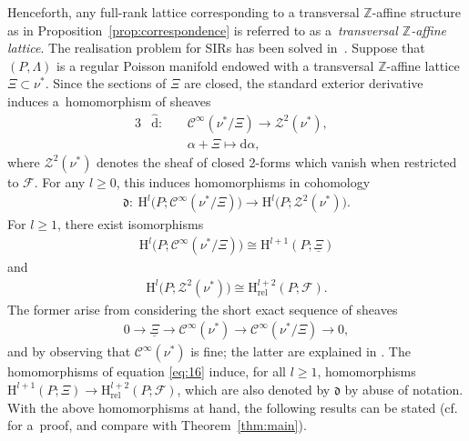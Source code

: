 \documentclass[10pt,a4paper]{amsart}
\numberwithin{equation}{section}
\newcommand{\de}{\mathrm{d}} %
\newcommand{\PM}{(P,\Lambda)} %
\newcommand{\HH}{\mathrm{H}}
\newcommand{\ZZ}{\mathbb{Z}}
\begin{document}
Henceforth, any full-rank lattice corresponding to a transversal $\ZZ$-af\/f\/ine structure as in Proposition~\ref{prop:correspondence} is referred to as a~{\it transversal $\ZZ$-affine lattice}. The realisation problem for SIRs has been solved in~\cite{dd}. Suppose that $\PM$ is a regular Poisson manifold endowed with a transversal $\ZZ$-af\/f\/ine lattice $\Xi \subset \nu^*$. Since the sections of $\Xi$ are closed, the standard exterior derivative induces a~homomorphism of sheaves
\begin{alignat*}{3}
 & \hat{\de} \colon \ && \mathcal{C}^{\infty}\left(\nu^* /\Xi \right) \to \mathcal{Z}^2(\nu^*), & \\
 &&& \alpha + \Xi \mapsto \de \alpha,&
\end{alignat*}
where $\mathcal{Z}^2(\nu^*)$ denotes the sheaf of closed 2-forms which vanish when restricted to $\mathcal{F}$. For any $l \geq 0$, this induces homomorphisms in cohomology
\begin{gather} \label{eq:16}
 \mathfrak{d}\colon \ \HH^l\big(P;\mathcal{C}^{\infty} (\nu^* /\Xi )\big) \to \HH^l\big(P;\mathcal{Z}^2(\nu^*)\big).
\end{gather}
For $l \geq 1$, there exist isomorphisms
\begin{gather*}
 \HH^l\big(P;\mathcal{C}^{\infty} (\nu^* /\Xi )\big) \cong \HH^{l+1} (P;\underline{\Xi} )
\end{gather*}
and
\begin{gather*}
 \HH^l\big(P;\mathcal{Z}^2(\nu^*)\big) \cong \HH_{\mathrm{rel}}^{l+2}(P;\mathcal{F}).
\end{gather*}
The former arise from considering the short exact sequence of sheaves
\begin{gather*} %
 0 \to \underline{\Xi} \to \mathcal{C}^{\infty}(\nu^*) \to \mathcal{C}^{\infty}(\nu^*/\Xi) \to 0,
\end{gather*}
and by observing that $\mathcal{C}^{\infty}(\nu^*)$ is f\/ine; the latter are explained in \cite[Section~4, Part~(a)]{dd}. The homomorphisms of equation \eqref{eq:16} induce, for all $l \geq 1$, homomorphisms $\HH^{l+1}(P;\Xi) \to \HH^{l+2}_{\mathrm{rel}}(P;\mathcal{F})$, which are also denoted by $\mathfrak{d}$ by abuse of notation. With the above homomorphisms at hand, the following results can be stated (cf.\ \cite[Theorems~4.2 and~4.3]{dd} for a~proof, and compare with Theorem~\ref{thm:main}).
\end{document}

